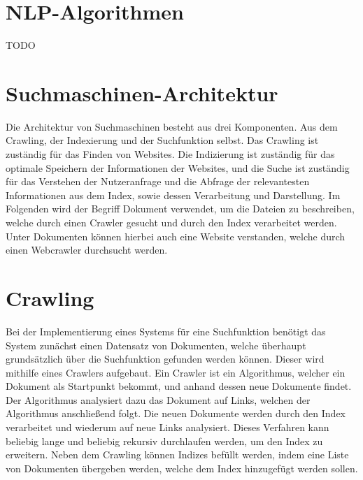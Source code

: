 \section{NLP-Algorithmen}

TODO

\section*{Suchmaschinen-Architektur}


Die Architektur von Suchmaschinen besteht aus drei Komponenten.
Aus dem Crawling, der Indexierung und der Suchfunktion selbst.
Das Crawling ist zuständig für das Finden von Websites.
Die Indizierung ist zuständig für das optimale Speichern der Informationen der Websites, und die Suche ist zuständig für das Verstehen der Nutzeranfrage und die Abfrage der relevantesten Informationen aus dem Index, sowie dessen Verarbeitung und Darstellung.
Im Folgenden wird der Begriff Dokument verwendet, um die Dateien zu beschreiben, welche durch einen Crawler gesucht und durch den Index verarbeitet werden.
Unter Dokumenten können hierbei auch eine Website verstanden, welche durch einen Webcrawler durchsucht werden.

\section{Crawling}
Bei der Implementierung eines Systems für eine Suchfunktion benötigt das System zunächst einen Datensatz von Dokumenten, welche überhaupt grundsätzlich über die Suchfunktion gefunden werden können.
Dieser wird mithilfe eines Crawlers aufgebaut.
Ein Crawler ist ein Algorithmus, welcher ein Dokument als Startpunkt bekommt, und anhand dessen neue Dokumente findet.
Der Algorithmus analysiert dazu das Dokument auf Links, welchen der Algorithmus anschließend folgt.
Die neuen Dokumente werden durch den Index verarbeitet und wiederum auf neue Links analysiert.
Dieses Verfahren kann beliebig lange und beliebig rekursiv durchlaufen werden, um den Index zu erweitern.
Neben dem Crawling können Indizes befüllt werden, indem eine Liste von Dokumenten übergeben werden, welche dem Index hinzugefügt werden sollen.

